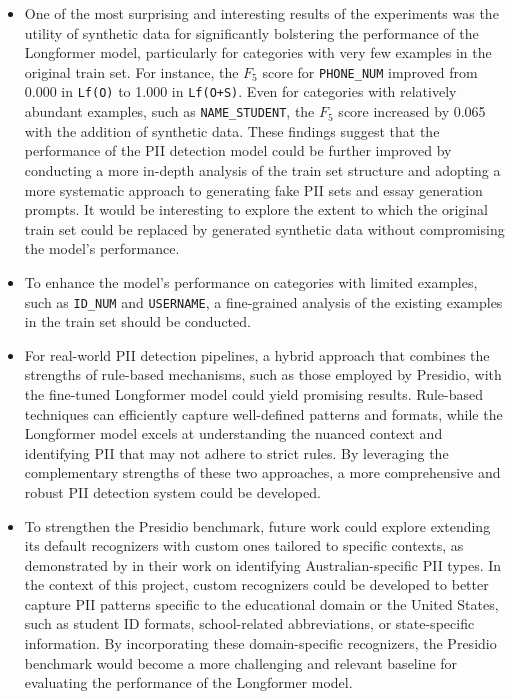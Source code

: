 \documentclass[11pt]{article}
\begin{document}
\begin{itemize}
\item One of the most surprising and interesting results of the experiments was the utility of synthetic data for significantly bolstering the performance of the Longformer model, particularly for categories with very few examples in the original train set. For instance, the $F_5$ score for \texttt{PHONE\_NUM} improved from 0.000 in \texttt{Lf(O)} to 1.000 in \texttt{Lf(O+S)}. Even for categories with relatively abundant examples, such as \texttt{NAME\_STUDENT}, the $F_5$ score increased by 0.065 with the addition of synthetic data. These findings suggest that the performance of the PII detection model could be further improved by conducting a more in-depth analysis of the train set structure and adopting a more systematic approach to generating fake PII sets and essay generation prompts. It would be interesting to explore the extent to which the original train set could be replaced by generated synthetic data without compromising the model's performance.
\item To enhance the model's performance on categories with limited examples, such as \texttt{ID\_NUM} and \texttt{USERNAME}, a fine-grained analysis of the existing examples in the train set should be conducted.
\item For real-world PII detection pipelines, a hybrid approach that combines the strengths of rule-based mechanisms, such as those employed by Presidio, with the fine-tuned Longformer model could yield promising results. Rule-based techniques can efficiently capture well-defined patterns and formats, while the Longformer model excels at understanding the nuanced context and identifying PII that may not adhere to strict rules. By leveraging the complementary strengths of these two approaches, a more comprehensive and robust PII detection system could be developed. 
\item To strengthen the Presidio benchmark, future work could explore extending its default recognizers with custom ones tailored to specific contexts, as demonstrated by \citealt{AzizStraiton2023PIIDetection} in their work on identifying Australian-specific PII types. In the context of this project, custom recognizers could be developed to better capture PII patterns specific to the educational domain or the United States, such as student ID formats, school-related abbreviations, or state-specific information. By incorporating these domain-specific recognizers, the Presidio benchmark would become a more challenging and relevant baseline for evaluating the performance of the Longformer model.
\end{itemize}
\end{document}
